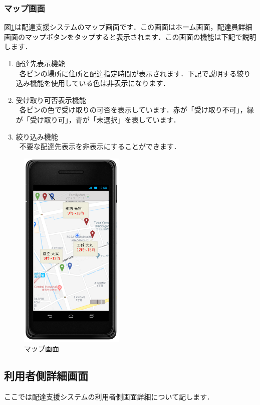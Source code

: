 \documentclass[a4j,titlepage]{jarticle}
\begin{document}
\newpage
\subsubsection{マップ画面}
図\ref{fig:map}は配達支援システムのマップ画面です．この画面はホーム画面，配達員詳細画面のマップボタンをタップすると表示されます．この画面の機能は下記で説明します．
\begin{enumerate}
	\item 配達先表示機能\\
	 \ 各ピンの場所に住所と配達指定時間が表示されます．下記で説明する絞り込み機能を使用している色は非表示になります．
	\item 受け取り可否表示機能\\
	 \ 各ピンの色で受け取りの可否を表示しています．赤が「受け取り不可」，緑が「受け取り可」，青が「未選択」を表しています．
	\item 絞り込み機能\\
   \ 不要な配達先表示を非表示にすることができます．

\end{enumerate}

\begin{figure}[H]
 \begin{center}
  \includegraphics[width=50mm]{map.png}
	\caption{マップ画面}
	\label{fig:map}
 \end{center}

\end{figure}

\newpage

\subsection{利用者側詳細画面}
ここでは配達支援システムの利用者側画面詳細について記します．
\end{document}

